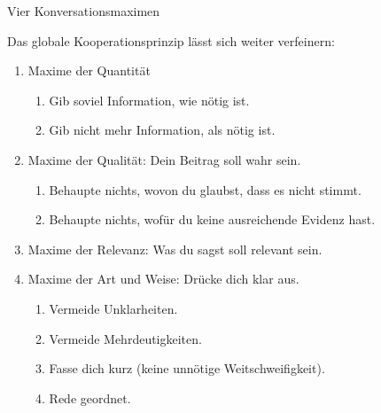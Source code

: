 \begin{frame}{Vier Konversationsmaximen}

Das globale Kooperationsprinzip lässt sich weiter verfeinern:

\begin{enumerate}
\item Maxime der \alert{Quantität}
    \begin{enumerate}
      \item Gib soviel Information, wie nötig ist.
      \item Gib nicht mehr Information, als nötig ist.
     \end{enumerate}\pause

\pause
\item Maxime der \alert{Qualität}: Dein Beitrag soll wahr sein.
  \begin{enumerate}
  \item Behaupte nichts, wovon du glaubst, dass es nicht stimmt.
  \item Behaupte nichts, wofür du keine ausreichende Evidenz hast.
  \end{enumerate}\pause

\pause
\item Maxime der \alert{Relevanz}: Was du sagst soll relevant sein.\pause

\pause
\item Maxime der \alert{Art und Weise}: Drücke dich klar aus.
  \begin{enumerate}
  \item Vermeide Unklarheiten.
  \item Vermeide Mehrdeutigkeiten.
  \item Fasse dich kurz (keine unnötige Weitschweifigkeit).
  \item Rede geordnet.
  \end{enumerate}
\end{enumerate}
\end{frame}


